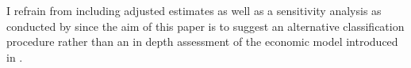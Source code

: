 I refrain from including adjusted estimates as well as a sensitivity analysis as conducted by \textcite{Ellingsen.2003} since the aim of this paper is to suggest an alternative classification procedure rather than an in depth assessment of the economic model introduced in \textcite{Ellingsen.2001}.


